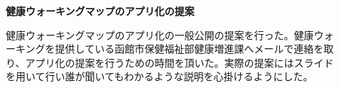﻿\begin{description}
 \item[]
  \textbf{健康ウォーキングマップのアプリ化の提案}\par
 健康ウォーキングマップのアプリ化の一般公開の提案を行った。健康ウォーキングを提供している函館市保健福祉部健康増進課へメールで連絡を取り、アプリ化の提案を行うための時間を頂いた。実際の提案にはスライドを用いて行い誰が聞いてもわかるような説明を心掛けるようにした。
  \par
\end{description}
